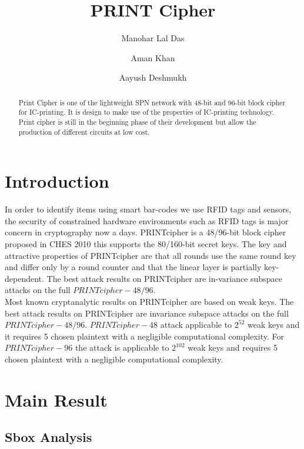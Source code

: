 \documentclass[journal=tosc,preprint]{iacrtrans}
\author{Manohar Lal Das \and Aman Khan \and Aayush Deshmukh}
\institute{
  IIT Bhilai, Raipur, India, \email{manoharlal@iitbhilai.ac.in}
  \and
  IIT Bhilai, Raipur, India, \email{amankhan@iitbhilai.ac.in}
  \and
  IIT Bhilai, Raipur, India, \email{aayushd@iitbhilai.ac.in}
}
\title{PRINT Cipher}
\begin{document}
\maketitle




\begin{abstract}
  Print Cipher is one of the lightweight SPN network with 48-bit and 96-bit block cipher for IC-printing. It is design to make use of the properties of IC-printing technology. Print cipher is still in the beginning phase of their development but allow the production of different circuits at low cost.
\end{abstract}


\section{Introduction}

In order to identify items using smart bar-codes we use RFID tags and sensors, the security of constrained hardware environments such as RFID tags is major concern in cryptography now a days. PRINTcipher is a 48/96-bit block cipher proposed in CHES 2010 this supports the 80/160-bit secret keys. The key and attractive properties of PRINTcipher are that all rounds use the same round key and differ only by a round counter and that the linear layer is partially key-dependent. The best attack results on PRINTcipher are in-variance subspace attacks on the full \(PRINTcipher-48/96\).\\

Most known cryptanalytic results on PRINTcipher are based on weak keys. The best attack results on PRINTcipher are invariance subspace attacks on the full \(PRINTcipher-48/96\). \(PRINTcipher-48\) attack applicable to \(2^{52}\) weak keys and it requires 5 chosen plaintext with a negligible computational complexity. For \(PRINTcipher-96\) the attack is applicable to \(2^{102}\) weak keys and requires 5 chosen plaintext with a negligible computational complexity.



\section{Main Result}
\label{sec:main}

\subsection{Sbox Analysis}
\end{document}
